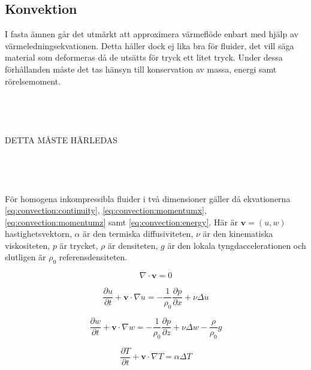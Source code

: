 \subsection{Konvektion}
\label{section:convection}
I fasta ämnen går det utmärkt att approximera värmeflöde enbart med hjälp
av värmeledningsekvationen. Detta håller dock ej lika bra för fluider, det vill säga
material som deformeras då de utsätts för tryck ett litet tryck.
Under dessa förhållanden
måste det tas hänsyn till konservation av massa, energi samt rörelsemoment.
\\\\\\\\\\
DETTA MÅSTE HÄRLEDAS
\\\\\\\\\\

För homogena inkompressibla fluider i två dimensioner gäller då ekvationerna
\eqref{eq:convection:continuity}, \eqref{eq:convection:momentumx},
\eqref{eq:convection:momentumz} samt \eqref{eq:convection:energy}. Här
är $\mathbf{v} = (u,w)$ hastighetsvektorn, $\alpha$ är den termiska
diffusiviteten, $\nu$ är den kinematiska viskositeten, $p$ är trycket,
$\rho$ är densiteten, $g$ är den lokala tyngdaccelerationen
och slutligen är $\rho_0$ referensdensiteten.

\begin{equation}
\label{eq:convection:continuity}
\nabla\cdot\mathbf{v} = 0
\end{equation}

\begin{equation}
\label{eq:convection:momentumx}
\frac{\partial u}{\partial t} + \mathbf{v}\cdot\nabla u = 
-\frac{1}{\rho_0}\frac{\partial p}{\partial x} + 
\nu\Delta u
\end{equation}

\begin{equation}
\label{eq:convection:momentumz}
\frac{\partial w}{\partial t} + \mathbf{v}\cdot\nabla w = 
-\frac{1}{\rho_0}\frac{\partial p}{\partial z} + \nu\Delta w - \frac{\rho}{\rho_0}g
\end{equation}

\begin{equation}
\label{eq:convection:energy}
\frac{\partial T}{\partial t} + \mathbf{v}\cdot\nabla T = \alpha\Delta T
\end{equation}

